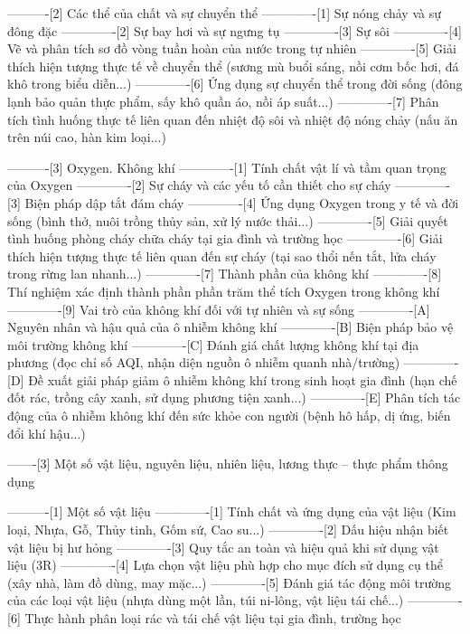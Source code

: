 ----------[2] Các thể của chất và sự chuyển thể
-------------[1] Sự nóng chảy và sự đông đặc
-------------[2] Sự bay hơi và sự ngưng tụ
-------------[3] Sự sôi
-------------[4] Vẽ và phân tích sơ đồ vòng tuần hoàn của nước trong tự nhiên
-------------[5] Giải thích hiện tượng thực tế về chuyển thể (sương mù buổi sáng, nồi cơm bốc hơi, đá khô trong biểu diễn...)
-------------[6] Ứng dụng sự chuyển thể trong đời sống (đông lạnh bảo quản thực phẩm, sấy khô quần áo, nồi áp suất...)
-------------[7] Phân tích tình huống thực tế liên quan đến nhiệt độ sôi và nhiệt độ nóng chảy (nấu ăn trên núi cao, hàn kim loại...)

----------[3] Oxygen. Không khí
-------------[1] Tính chất vật lí và tầm quan trọng của Oxygen
-------------[2] Sự cháy và các yếu tố cần thiết cho sự cháy
-------------[3] Biện pháp dập tắt đám cháy
-------------[4] Ứng dụng Oxygen trong y tế và đời sống (bình thở, nuôi trồng thủy sản, xử lý nước thải...)
-------------[5] Giải quyết tình huống phòng cháy chữa cháy tại gia đình và trường học
-------------[6] Giải thích hiện tượng thực tế liên quan đến sự cháy (tại sao thổi nến tắt, lửa cháy trong rừng lan nhanh...)
-------------[7] Thành phần của không khí
-------------[8] Thí nghiệm xác định thành phần phần trăm thể tích Oxygen trong không khí
-------------[9] Vai trò của không khí đối với tự nhiên và sự sống
-------------[A] Nguyên nhân và hậu quả của ô nhiễm không khí
-------------[B] Biện pháp bảo vệ môi trường không khí
-------------[C] Đánh giá chất lượng không khí tại địa phương (đọc chỉ số AQI, nhận diện nguồn ô nhiễm quanh nhà/trường)
-------------[D] Đề xuất giải pháp giảm ô nhiễm không khí trong sinh hoạt gia đình (hạn chế đốt rác, trồng cây xanh, sử dụng phương tiện xanh...)
-------------[E] Phân tích tác động của ô nhiễm không khí đến sức khỏe con người (bệnh hô hấp, dị ứng, biến đổi khí hậu...)

-------[3] Một số vật liệu, nguyên liệu, nhiên liệu, lương thực – thực phẩm thông dụng

----------[1] Một số vật liệu
-------------[1] Tính chất và ứng dụng của vật liệu (Kim loại, Nhựa, Gỗ, Thủy tinh, Gốm sứ, Cao su...)
-------------[2] Dấu hiệu nhận biết vật liệu bị hư hỏng
-------------[3] Quy tắc an toàn và hiệu quả khi sử dụng vật liệu (3R)
-------------[4] Lựa chọn vật liệu phù hợp cho mục đích sử dụng cụ thể (xây nhà, làm đồ dùng, may mặc...)
-------------[5] Đánh giá tác động môi trường của các loại vật liệu (nhựa dùng một lần, túi ni-lông, vật liệu tái chế...)
-------------[6] Thực hành phân loại rác và tái chế vật liệu tại gia đình, trường học

